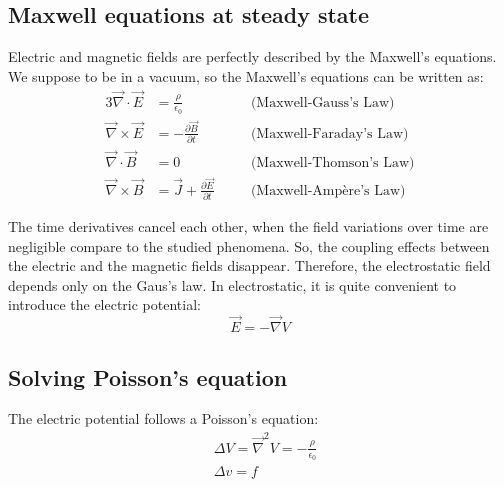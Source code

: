 \begin{refsection}
  \subsection{Maxwell equations at steady state}
  Electric and magnetic fields are perfectly described by the Maxwell's equations. We suppose to be in a vacuum, so the Maxwell's equations can be written as:
  \begin{alignat*}{3}
    \overrightarrow{\nabla} \cdot \overrightarrow{E} &= \frac{\rho}{\epsilon_{0}}\quad &&\text{(Maxwell-Gauss's Law)}\\
     \overrightarrow{\nabla} \times \overrightarrow{E} &= - \frac{\partial \overrightarrow{B}}{\partial t}\quad &&\text{(Maxwell-Faraday's Law)}\\
     \overrightarrow{\nabla} \cdot \overrightarrow{B} &= 0\quad &&\text{(Maxwell-Thomson's Law)}\\
     \overrightarrow{\nabla} \times \overrightarrow{B} &= \overrightarrow{J} + \frac{\partial \overrightarrow{E}}{\partial t}\quad &&\text{(Maxwell-Ampère's Law)}
  \end{alignat*}

  The time derivatives cancel each other, when the field variations over time are negligible compare to the studied phenomena. So, the coupling effects between the electric and the magnetic fields disappear. Therefore, the electrostatic field depends only on the Gaus’s law. In electrostatic, it is quite convenient to introduce the electric potential:
  \begin{equation}
    \vec{E} = - \vec{\nabla}V
  \end{equation}

  \subsection{Solving Poisson's equation}
  The electric potential follows a Poisson's equation:
  \begin{align}
    &\Delta V = \vec{\nabla}^{2}V = -\frac{\rho}{\epsilon_{0}}\\
    &\Delta v = f
  \end{align}
  

\end{refsection}
